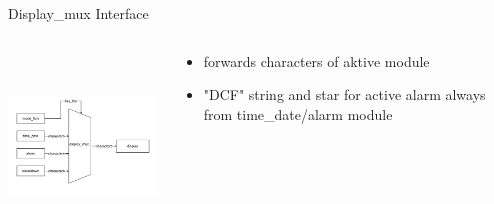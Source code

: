 \documentclass{beamer}
\begin{document}
\begin{frame}{Display\_mux Interface}
    \begin{columns}
    \begin{column}{6cm}
        \includegraphics[width=60mm, height=50mm]{pictures/display_mux_interface.png}
    \end{column}
    \begin{column}{6cm}
    \begin{itemize}
        \item forwards characters of aktive module
        \item "DCF" string and star for active alarm always from time\_date/alarm module 
    \end {itemize}
    \end{column}
    \end{columns}
  \end{frame}
\end{document}
